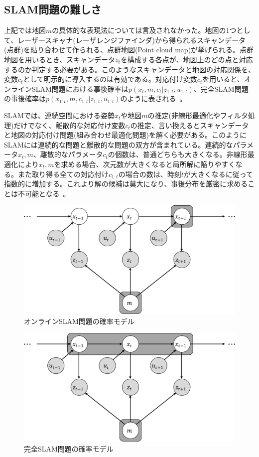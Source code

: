 \documentclass[dvipdfmx,a4paper]{jsarticle}
\begin{document}
\subsection{SLAM問題の難しさ}
上記では地図$m$の具体的な表現法については言及されなかった。地図の1つとして、レーザースキャナ(レーザレンジファインダ)から得られるスキャンデータ(点群)を貼り合わせて作られる、点群地図(Point cloud map)が挙げられる。点群地図を用いるとき、スキャンデータ$z_t$を構成する各点が、地図上のどの点と対応するのか判定する必要がある。このようなスキャンデータと地図の対応関係を、変数$c_t$として明示的に導入するのは有効である。対応付け変数$c_t$を用いると、オンラインSLAM問題における事後確率は$p(x_t, m, c_t | z_{1 : t}, u_{1 : t})$、完全SLAM問題の事後確率は$p(x_{1 : t}, m, c_{1 : t} | z_{1 : t}, u_{1 : t})$のように表される~\cite{Thrun07}\cite{Tomono16}\cite{Tomono18}。\newline

SLAMでは、連続空間における姿勢$x_t$や地図$m$の推定(非線形最適化やフィルタ処理)だけでなく、離散的な対応付け変数$c_t$の推定、言い換えるとスキャンデータと地図の対応付け問題(組み合わせ最適化問題)を解く必要がある。このようにSLAMには連続的な問題と離散的な問題の双方が含まれている。連続的なパラメータ$x_t, m$、離散的なパラメータ$c_t$の個数は、普通どちらも大きくなる。非線形最適化により$x_t, m$を求める場合、次元数が大きくなると局所解に陥りやすくなる。また取り得る全ての対応付け$c_{1 : t}$の場合の数は、時刻$t$が大きくなるに従って指数的に増加する。これより解の候補は莫大になり、事後分布を厳密に求めることは不可能となる~\cite{Thrun07}\cite{Tomono16}\cite{Tomono18}。

\begin{figure}[htbp]
	\centering
	\includegraphics[keepaspectratio, scale=0.5]{figures/online-slam.pdf}
	\caption{オンラインSLAM問題の確率モデル}
	\label{fig:online-slam}
\end{figure}

\begin{figure}[htbp]
	\centering
	\includegraphics[keepaspectratio, scale=0.5]{figures/full-slam.pdf}
	\caption{完全SLAM問題の確率モデル}
	\label{fig:full-slam}
\end{figure}

\newpage



\end{document}
